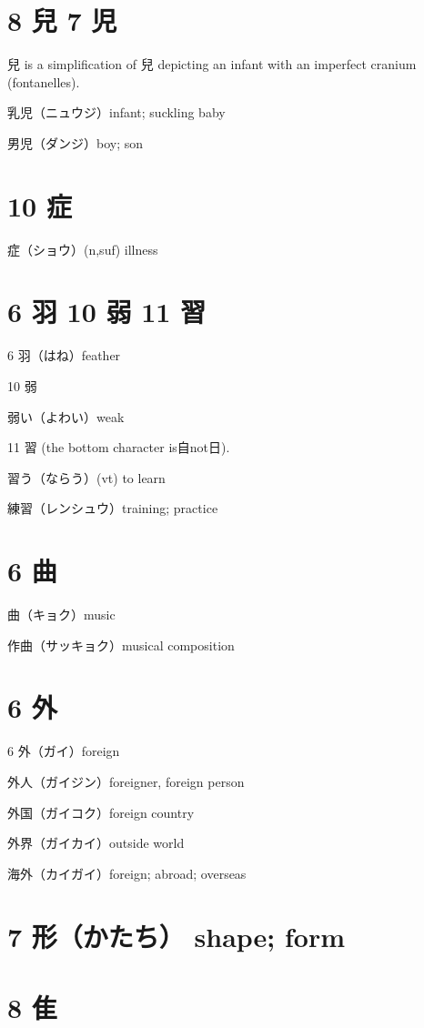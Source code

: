 \section{8 兒 7 児}

兒 is a simplification of 兒 depicting an infant
with an imperfect cranium (fontanelles).

乳児（ニュウジ）infant; suckling baby

男児（ダンジ）boy; son

\section{10 症}

症（ショウ）(n,suf) illness

\section{6 羽 10 弱 11 習}

6 羽（はね）feather

10 弱

弱い（よわい）weak

11 習 (the bottom character is自not日).

習う（ならう）(vt) to learn

練習（レンシュウ）training; practice

\section{6 曲}

曲（キョク）music

作曲（サッキョク）musical composition

\section{6 外}

6 外（ガイ）foreign

外人（ガイジン）foreigner, foreign person

外国（ガイコク）foreign country

外界（ガイカイ）outside world

海外（カイガイ）foreign; abroad; overseas

\section{7 形（かたち） shape; form}

\section{8 隹}

